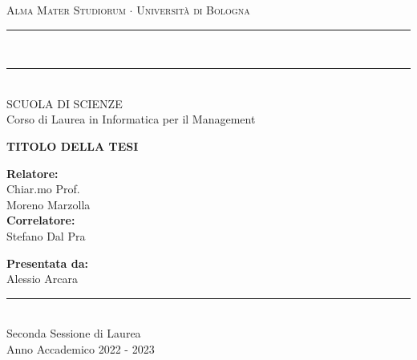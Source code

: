 \begin{titlepage}
  \centering
  {\Large \textsc{Alma Mater Studiorum $\cdot$ Università di Bologna}} \\
  \vspace{1mm}
  \rule[0.1cm]{15.8cm}{0.1mm} \\
  \rule[0.5cm]{15.8cm}{0.6mm} \\
  {\small SCUOLA DI SCIENZE \\
  Corso di Laurea in Informatica per il Management} \\
  
  \vspace{40mm}
  
  {\LARGE \textbf{TITOLO DELLA TESI}} \\
  
  \vspace{40mm}
  
  \begin{minipage}[t]{0.47\textwidth}
    \raggedright
    \large \textbf{Relatore:} \\
    Chiar.mo Prof. \\
    Moreno Marzolla \\
    \vspace{5mm}
    \textbf{Correlatore:} \\
    Stefano Dal Pra
  \end{minipage}
  \hfill
  \begin{minipage}[t]{0.47\textwidth}
    \raggedleft
    \large \textbf{Presentata da:} \\
    Alessio Arcara
  \end{minipage}
  
  \vspace{20mm}
  
  \rule[0.1cm]{15.8cm}{0.1mm} \\
  {\large Seconda Sessione di Laurea \\
  Anno Accademico 2022 - 2023}

\end{titlepage}
